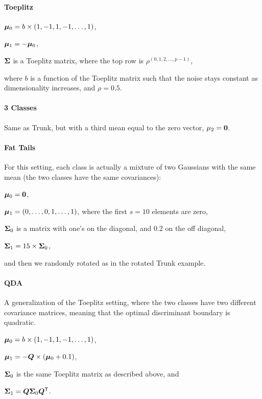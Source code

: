 \documentclass[10pt]{article}
\begin{document}
\paragraph*{Toeplitz} 
\begin{compactitem}
\item $\boldsymbol{\mu}_0=b \times (1,-1,1,-1,\ldots,1)$, 
\item $\boldsymbol{\mu}_1= - \boldsymbol{\mu}_0$, 
\item $\boldsymbol{\Sigma}$ is a Toeplitz matrix, where the top row is $\rho^{(0,1,2,\ldots,p-1)}$,
\end{compactitem}
where $b$ is a function of the Toeplitz matrix such that the noise stays constant as dimensionality increases, and $\rho=0.5$.






\paragraph*{3 Classes} Same as Trunk, but with a third mean equal to the zero vector, $\mu_2=\boldsymbol{0}$.


\paragraph*{Fat Tails} For this setting, each class is actually a mixture of two Gaussians with the same mean (the two classes have the same covariances): 
\begin{compactitem}
\item $\boldsymbol{\mu}_0=\boldsymbol{0}$, 
\item $\boldsymbol{\mu}_1=(0,\ldots,0,1,\ldots,1)$, where the first $s=10$ elements are zero, 
\item $\boldsymbol{\Sigma}_0$ is a matrix with one's on the diagonal, and $0.2$ on the off diagonal,
\item $\boldsymbol{\Sigma}_1 = 15 \times \boldsymbol{\Sigma}_0$,
\end{compactitem}
and then we randomly rotated as in the rotated Trunk example.




\paragraph*{QDA} A generalization of the Toeplitz setting, where the two classes have two different covariance matrices, meaning that the optimal discriminant boundary is quadratic.
\begin{compactitem}
\item $\boldsymbol{\mu}_0=b \times (1,-1,1,-1,\ldots,1)$, 
\item $\boldsymbol{\mu}_1=-\boldsymbol{Q} \times (\boldsymbol{\mu}_0+0.1)$, 
\item $\boldsymbol{\Sigma}_0$ is the same Toeplitz matrix as described above, and 
\item $\boldsymbol{\Sigma}_1 = \boldsymbol{Q} \boldsymbol{\Sigma}_0 \boldsymbol{Q}^{\mathsf{T}}$.
\end{compactitem}
\end{document}
